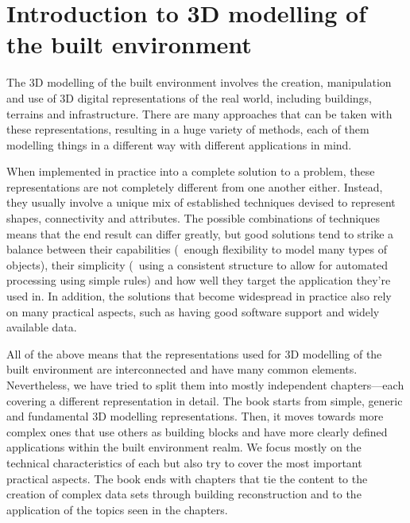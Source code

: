 
\setchapterpreamble[u]{\margintoc}

\graphicspath{{intro/}}

\chapter{Introduction to 3D modelling of the built environment}%
\label{chap:intro}



The 3D modelling of the built environment involves the creation, manipulation and use of 3D digital representations of the real world, including buildings, terrains and infrastructure.
There are many approaches that can be taken with these representations, resulting in a huge variety of methods, each of them modelling things in a different way with different applications in mind.


When implemented in practice into a complete solution to a problem, these representations are not completely different from one another either.
Instead, they usually involve a unique mix of established techniques devised to represent shapes, connectivity and attributes.
The possible combinations of techniques means that the end result can differ greatly, but good solutions tend to strike a balance between their capabilities (\eg\ enough flexibility to model many types of objects), their simplicity (\eg\ using a consistent structure to allow for automated processing using simple rules) and how well they target the application they're used in.
In addition, the solutions that become widespread in practice also rely on many practical aspects, such as having good software support and widely available data.


All of the above means that the representations used for 3D modelling of the built environment are interconnected and have many common elements.
Nevertheless, we have tried to split them into mostly independent chapters---each covering a different representation in detail.
The book starts from simple, generic and fundamental 3D modelling representations.
Then, it moves towards more complex ones that use others as building blocks and have more clearly defined applications within the built environment realm.
We focus mostly on the technical characteristics of each but also try to cover the most important practical aspects.
The book ends with chapters that tie the content to the creation of complex data sets through building reconstruction and to the application of the topics seen in the chapters.

